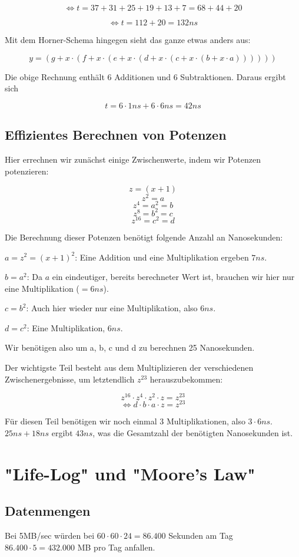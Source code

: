 \documentclass{article}
\begin{document}
	\[ \Leftrightarrow t = 37 + 31 + 25 + 19 + 13 + 7 = 68 + 44 + 20 \]

	\[ \Leftrightarrow t = 112+ 20 = 132 ns \]

	Mit dem Horner-Schema hingegen sieht das ganze etwas anders aus:

	\[y=(g + x \cdot (f + x \cdot (e + x \cdot (d + x \cdot (c + x \cdot (b + x \cdot a))))))\]

	Die obige Rechnung enthält 6 Additionen und 6 Subtraktionen. Daraus ergibt sich 

	\[ t = 6 \cdot 1ns+6 \cdot 6 ns = 42  ns \]

\subsection{Effizientes Berechnen von Potenzen}
	Hier errechnen wir zunächst einige Zwischenwerte, indem wir Potenzen potenzieren:

	\[ z = (x + 1) \]
	\[ z^2 = a \]
	\[ z^4 = a^2 = b \]
	\[ z^8 = b^2 = c \]
	\[ z^16 = c^2 = d \]

	Die Berechnung dieser Potenzen benötigt folgende Anzahl an Nanosekunden:

	\( a = z^2 = (x + 1)^2 \): Eine Addition und eine Multiplikation ergeben \(7ns\).

	\( b = a^2 \): Da \(a\) ein eindeutiger, bereits berechneter Wert ist, brauchen wir hier nur eine Multiplikation (\(=6ns\)).

	\( c = b^2 \): Auch hier wieder nur eine Multiplikation, also \(6ns\).

	\( d = c^2 \): Eine Multiplikation, \(6ns\).

	Wir benötigen also um a, b, c und d zu berechnen 25 Nanosekunden.

	Der wichtigste Teil besteht aus dem Multiplizieren der verschiedenen Zwischenergebnisse, um letztendlich \(z^{23}\) herauszubekommen:

	\[z^{16} \cdot z^4 \cdot z^2 \cdot z = z^{23} \]
	\[ \Leftrightarrow d \cdot b \cdot a \cdot z = z^{23} \]

	Für diesen Teil benötigen wir noch einmal 3 Multiplikationen, also \(3 \cdot 6ns\). \(25ns + 18ns \) ergibt \(43ns\), was die Gesamtzahl der benötigten Nanosekunden ist.

\section{"Life-Log" und "Moore's Law"}
	\subsection{Datenmengen}
	Bei 5MB/sec würden bei \(60 \cdot 60 \cdot 24 = 86.400\) Sekunden am Tag \(86.400 \cdot 5 = 432.000\) MB pro Tag anfallen.
\end{document}
